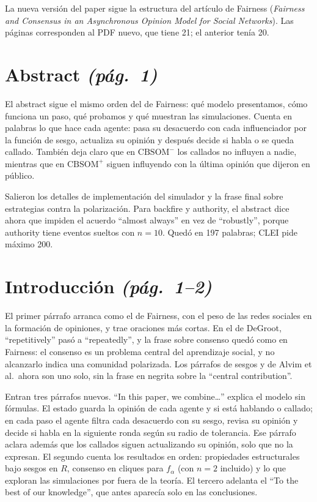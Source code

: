 \documentclass[11pt,a4paper]{article}
\newcommand{\CBm}{$\mathrm{CBSOM}^{-}$}
\newcommand{\CBp}{$\mathrm{CBSOM}^{+}$}
\newcommand{\pag}[1]{\textit{(pág.~#1)}}
\begin{document}
La nueva versión del paper sigue la estructura del artículo de Fairness
(\textit{Fairness and Consensus in an Asynchronous Opinion Model for Social
Networks}). Las páginas corresponden al PDF nuevo, que tiene 21; el anterior
tenía 20.

\section*{Abstract \pag{1}}

El abstract sigue el mismo orden del de Fairness: qué modelo presentamos, cómo
funciona un paso, qué probamos y qué muestran las simulaciones. Cuenta en
palabras lo que hace cada agente: pasa su desacuerdo con cada influenciador por
la función de sesgo, actualiza su opinión y después decide si habla o se queda
callado. También deja claro que en \CBm{} los callados no influyen a nadie,
mientras que en \CBp{} siguen influyendo con la última opinión que dijeron en
público.

Salieron los detalles de implementación del simulador y la frase final sobre
estrategias contra la polarización. Para backfire y authority, el abstract dice
ahora que impiden el acuerdo ``almost always'' en vez de ``robustly'', porque
authority tiene eventos sueltos con $n=10$. Quedó en 197 palabras; CLEI pide
máximo 200.

\section*{Introducción \pag{1--2}}

El primer párrafo arranca como el de Fairness, con el peso de las redes
sociales en la formación de opiniones, y trae oraciones más cortas. En el de
DeGroot, ``repetitively'' pasó a ``repeatedly'', y la frase sobre consenso quedó
como en Fairness: el consenso es un problema central del aprendizaje social, y
no alcanzarlo indica una comunidad polarizada. Los párrafos de sesgos y de
Alvim et al.\ ahora son uno solo, sin la frase en negrita sobre la ``central
contribution''.

Entran tres párrafos nuevos. ``In this paper, we combine\ldots'' explica el
modelo sin fórmulas. El estado guarda la opinión de cada agente y si está
hablando o callado; en cada paso el agente filtra cada desacuerdo con su sesgo,
revisa su opinión y decide si habla en la siguiente ronda según su radio de
tolerancia. Ese párrafo aclara además que los callados siguen actualizando su
opinión, solo que no la expresan. El segundo cuenta los resultados en orden:
propiedades estructurales bajo sesgos en $R$, consenso en cliques para
$f_\alpha$ (con $n=2$ incluido) y lo que exploran las simulaciones por fuera de
la teoría. El tercero adelanta el ``To the best of our knowledge'', que antes
aparecía solo en las conclusiones.
\end{document}
